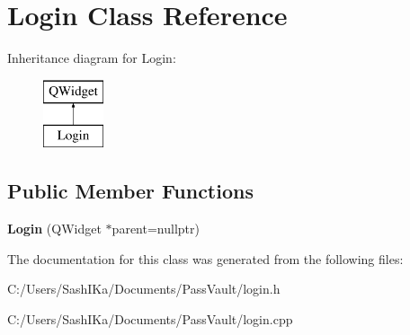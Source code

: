 \hypertarget{class_login}{}\section{Login Class Reference}
\label{class_login}
Inheritance diagram for Login\+:\begin{figure}[H]
\begin{center}
\leavevmode
\includegraphics[height=2.000000cm]{class_login}
\end{center}
\end{figure}
\subsection*{Public Member Functions}
\begin{DoxyCompactItemize}
\item 
\mbox{\label{class_login_a5d0ad68bb85df1299c7513e476211c98}} 
{\bfseries Login} (Q\+Widget $\ast$parent=nullptr)
\end{DoxyCompactItemize}


The documentation for this class was generated from the following files\+:\begin{DoxyCompactItemize}
\item 
C\+:/\+Users/\+Sash\+I\+Ka/\+Documents/\+Pass\+Vault/login.\+h\item 
C\+:/\+Users/\+Sash\+I\+Ka/\+Documents/\+Pass\+Vault/login.\+cpp\end{DoxyCompactItemize}
